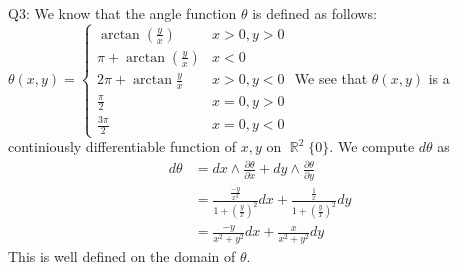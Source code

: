 \documentclass[letterpaper]{article}
\DeclareMathOperator{\R}{\mathbb{R}}
\newcommand{\bd}{\partial}
\begin{document}
\noindent Q3: We know that the angle function $\theta$ is defined as follows: 
$\theta(x,y) = \begin{cases} \arctan(\frac{y}{x}) & x>0,y>0 \\ \pi + \arctan(\frac{y}{x})  & x<0 
\\ 2\pi + \arctan{\frac{y}{x}} & x>0,y<0 \\ \frac{\pi}{2}  & x=0,y>0 \\ \frac{3\pi}{2} & x=0,y<0 \end{cases}$ We see that $\theta(x,y)$ is a continiously differentiable function of $x,y$ on $\R^2\{0\}$. We compute $d\theta$ as
\begin{align*}
    d\theta & = dx \wedge \frac{\bd \theta}{\bd x} + dy \wedge \frac{\bd \theta}{\bd y}
    \\ & = \frac{\frac{-y}{x^2}}{1+(\frac{y}{x})^2}dx + \frac{\frac{1}{x}}{1+(\frac{y}{x})^2}dy
    \\ & = \frac{-y}{x^2+y^2}dx + \frac{x}{x^2+y^2}dy
\end{align*}This is well defined on the domain of $\theta$. 
\end{document}
